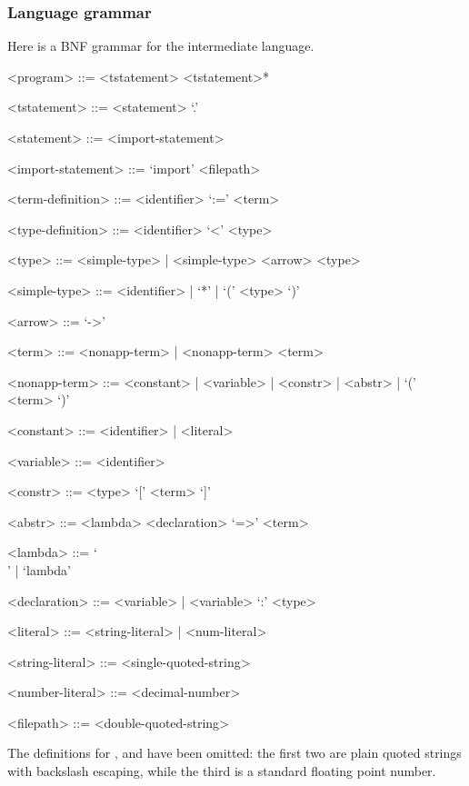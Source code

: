 \documentclass[main.tex]{subfiles}
\begin{document}
\subsubsection{Language grammar}
\label{minipass:grammar}
Here is a BNF grammar for the intermediate language.
\begin{grammar}
    <program> ::= <tstatement> <tstatement>*

    <tstatement> ::= <statement> `.'

    <statement>  ::= <import-statement>

    <import-statement> ::= `import' <filepath>

    <term-definition>  ::= <identifier> `:=' <term>

    <type-definition>  ::= <identifier> `<' <type>

    <type> ::= <simple-type> | <simple-type> <arrow> <type>

    <simple-type> ::= <identifier> | `*' | `(' <type> `)'

    <arrow> ::= `->'

    <term> ::= <nonapp-term> | <nonapp-term> <term>

    <nonapp-term> ::= <constant> | <variable> | <constr> | <abstr> | `(' <term> `)'

    <constant> ::= <identifier> | <literal>

    <variable> ::= <identifier>

    <constr> ::= <type> `[' <term> `]'

    <abstr> ::= <lambda> <declaration> `=>' <term>

    <lambda> ::= `\\' | `lambda'

    <declaration> ::= <variable> | <variable> `:' <type>

    <literal> ::= <string-literal> | <num-literal>

    <string-literal> ::= <single-quoted-string>

    <number-literal> ::= <decimal-number>

    <filepath> ::= <double-quoted-string>
\end{grammar}

The definitions for ,
and 
have been omitted: the first two are plain quoted strings with backslash escaping,
while the third is a standard floating point number.
\end{document}
